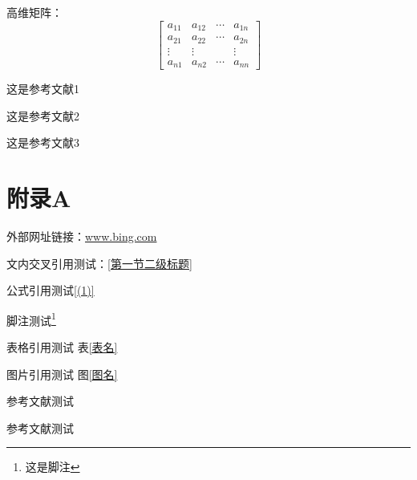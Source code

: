 \documentclass[a4paper,AutoFakeBold={2.7}]{ctexart} %
\begin{document}
高维矩阵：
\begin{equation}
	\left[ \begin{array}{cccc}
		a_{11}&a_{12}&\cdots&a_{1n}\\
		a_{21}&a_{22}&\cdots&a_{2n}\\
		\vdots&\vdots&{}&\vdots\\
		a_{n1}&a_{n2}&\cdots&a_{nn}
	\end{array}\right] 
\end{equation}
\begin{thebibliography}{99}
	这是参考文献1
	
	这是参考文献2
	
	这是参考文献3
\end{thebibliography}
\section*{附录A}
外部网址链接：\url{www.bing.com}

文内交叉引用测试：\ref{第一节二级标题}

公式引用测试\ref{(1)}

脚注测试\footnote{这是脚注}

表格引用测试 表\ref{表名}

图片引用测试 图\ref{图名}

参考文献测试\textsuperscript{\cite{参考文献1}}

参考文献测试\textsuperscript{\cite{参考文献1}\cite{参考文献2}}
\end{document}
